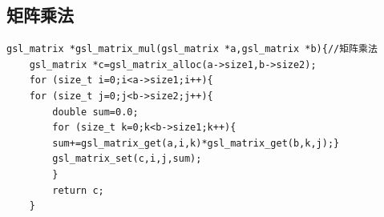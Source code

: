 \documentclass[a4paper,11pt,onecolumn,twoside]{article}
\begin{document}
\begin{appendix}
\section{矩阵乘法}
\begin{lstlisting}
gsl_matrix *gsl_matrix_mul(gsl_matrix *a,gsl_matrix *b){//矩阵乘法
	gsl_matrix *c=gsl_matrix_alloc(a->size1,b->size2);
	for (size_t i=0;i<a->size1;i++){
	for (size_t j=0;j<b->size2;j++){
		double sum=0.0;
		for (size_t k=0;k<b->size1;k++){
		sum+=gsl_matrix_get(a,i,k)*gsl_matrix_get(b,k,j);}
		gsl_matrix_set(c,i,j,sum);
		}
		return c;
	}
\end{lstlisting}
\end{appendix}
\end{document}
